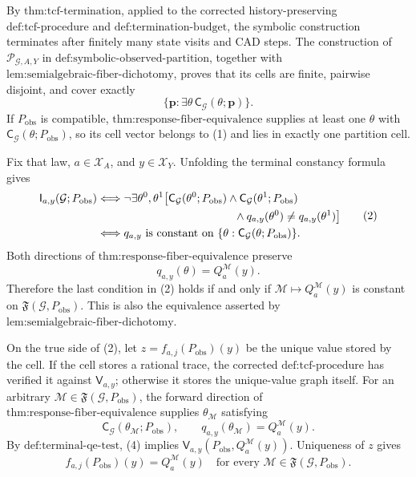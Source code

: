 By \(\text{thm:tcf-termination}\), applied to the corrected history-preserving \(\text{def:tcf-procedure}\) and \(\text{def:termination-budget}\), the symbolic construction terminates after finitely many state visits and CAD steps. The construction of \(\mathscr P_{\mathcal G,A,Y}\) in \(\text{def:symbolic-observed-partition}\), together with \(\text{lem:semialgebraic-fiber-dichotomy}\), proves that its cells are finite, pairwise disjoint, and cover exactly
\[
\{\mathbf p:\exists\theta\,\mathsf C_{\mathcal G}(\theta;\mathbf p)\}.
\tag{1}
\]
If \(P_{\mathrm{obs}}\) is compatible, \(\text{thm:response-fiber-equivalence}\) supplies at least one \(\theta\) with \(\mathsf C_{\mathcal G}(\theta;P_{\mathrm{obs}})\), so its cell vector belongs to (1) and lies in exactly one partition cell.

Fix that law, \(a\in\mathcal X_A\), and \(y\in\mathcal X_Y\). Unfolding the terminal constancy formula gives
\[
\begin{aligned}
\mathsf I_{a,y}(\mathcal G;P_{\mathrm{obs}})
&\Longleftrightarrow
\neg\exists\theta^0,\theta^1\bigl[
\mathsf C_{\mathcal G}(\theta^0;P_{\mathrm{obs}})
\wedge\mathsf C_{\mathcal G}(\theta^1;P_{\mathrm{obs}})\\
&\hspace{43mm}\wedge
q_{a,y}(\theta^0)\neq q_{a,y}(\theta^1)
\bigr]\\
&\Longleftrightarrow
q_{a,y}\text{ is constant on }
\{\theta:\mathsf C_{\mathcal G}(\theta;P_{\mathrm{obs}})\}.
\end{aligned}
\tag{2}
\]
Both directions of \(\text{thm:response-fiber-equivalence}\) preserve
\[
q_{a,y}(\theta)=Q_a^{\mathcal M}(y).
\tag{3}
\]
Therefore the last condition in (2) holds if and only if \(\mathcal M\mapsto Q_a^{\mathcal M}(y)\) is constant on \(\mathfrak F(\mathcal G,P_{\mathrm{obs}})\). This is also the equivalence asserted by \(\text{lem:semialgebraic-fiber-dichotomy}\).

On the true side of (2), let \(z=f_{a,j}(P_{\mathrm{obs}})(y)\) be the unique value stored by the cell. If the cell stores a rational trace, the corrected \(\text{def:tcf-procedure}\) has verified it against \(\mathsf V_{a,y}\); otherwise it stores the unique-value graph itself. For an arbitrary \(\mathcal M\in\mathfrak F(\mathcal G,P_{\mathrm{obs}})\), the forward direction of \(\text{thm:response-fiber-equivalence}\) supplies \(\theta_{\mathcal M}\) satisfying
\[
\mathsf C_{\mathcal G}(\theta_{\mathcal M};P_{\mathrm{obs}}),
\qquad
q_{a,y}(\theta_{\mathcal M})=Q_a^{\mathcal M}(y).
\tag{4}
\]
By \(\text{def:terminal-qe-test}\), (4) implies \(\mathsf V_{a,y}(P_{\mathrm{obs}},Q_a^{\mathcal M}(y))\). Uniqueness of \(z\) gives
\[
f_{a,j}(P_{\mathrm{obs}})(y)=Q_a^{\mathcal M}(y)
\quad\text{for every }\mathcal M\in\mathfrak F(\mathcal G,P_{\mathrm{obs}}).
\tag{5}
\]

